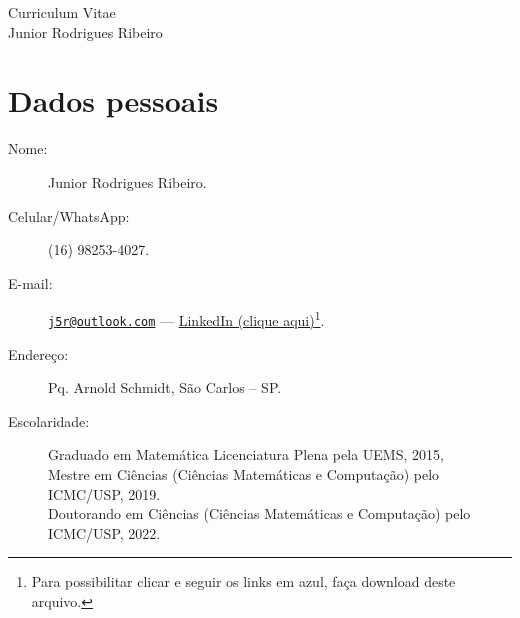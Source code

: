 \documentclass[11pt]{article}
\begin{document}
\begin{center}
\huge \sc Curriculum Vitae\\
\Large \sc Junior Rodrigues Ribeiro
\end{center}

\begin{flushright}
\end{flushright}
\vspace*{-4.4cm}

\section{Dados pessoais\dotfill  \hspace{3.4cm}\ }
\begin{description}
\item[Nome:] Junior Rodrigues Ribeiro.
\item[Celular/WhatsApp:] (16) 98253-4027.
\item[E-mail:] \href{mailto:j5r@outlook.com}{\nolinkurl{j5r@outlook.com}} --- \href{https://www.linkedin.com/in/junior-r-ribeiro-1b3378109}{LinkedIn (clique aqui)}\footnote{Para possibilitar clicar e seguir os links em azul, faça download deste arquivo.}.
\item[Endereço:] Pq. Arnold Schmidt, São Carlos -- SP.
\item[Escolaridade:] Graduado em Matemática Licenciatura Plena pela UEMS, 2015,\\
\phantom{Escolarid} Mestre em Ciências (Ciências Matemáticas e Computação) pelo ICMC/USP, 2019.\\
\phantom{Escolarid} Doutorando em Ciências (Ciências Matemáticas e Computação) pelo ICMC/USP, 2022.
\end{description}
\end{document}

